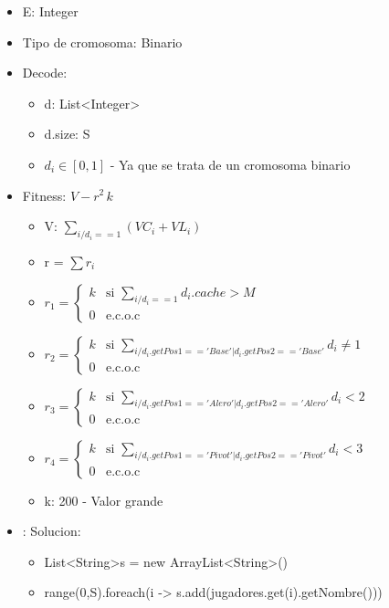 \documentclass[a4paper,12pt]{article}
\begin{document}
\begin{itemize}
  \item E: Integer
  \item Tipo de cromosoma: Binario
  \item Decode:
  \begin{itemize}
    \item d: List\textless Integer\textgreater
    \item d.size: S
    \item $ d_i \in [0,1] $ - Ya que se trata de un cromosoma binario
  \end{itemize}
  \item Fitness: $V - r^2 \,k$
  \begin{itemize}
    \item V: $\sum_{i / d_i == 1}{(VC_i + VL_i)}$
    \item r = $\sum{r_i}$
    \item $r_1 =
      \begin{cases}
        k &\mbox{si } \sum_{i / d_i == 1}{d_i.cache} > M\\
        0 &\mbox{e.c.o.c }
      \end{cases}
      $

    \item $r_2 =
      \begin{cases}
      k &\mbox{si } \sum_{i / d_i.getPos1 == 'Base'| d_i.getPos2 == 'Base'}{d_i} \neq 1
      \\
      0 &\mbox{e.c.o.c}
      \end{cases}
      $

    \item $r_3 =
    \begin{cases}
    k &\mbox{si } \sum_{i / d_i.getPos1 == 'Alero'| d_i.getPos2 == 'Alero'}{d_i} < 2
    \\
    0 &\mbox{e.c.o.c}
    \end{cases}
    $
    \item $r_4 =
    \begin{cases}
    k &\mbox{si } \sum_{i / d_i.getPos1 == 'Pivot'| d_i.getPos2 == 'Pivot'}{d_i} < 3
    \\
    0 &\mbox{e.c.o.c}
    \end{cases}
    $

    \item k: 200 - Valor grande
  \end{itemize}
  \item: Solucion:
  \begin{itemize}
    \item List\textless String\textgreater s = new ArrayList\textless String\textgreater()
    \item range(0,S).foreach(i -> s.add(jugadores.get(i).getNombre()))
  \end{itemize}
\end{itemize}
\end{document}
